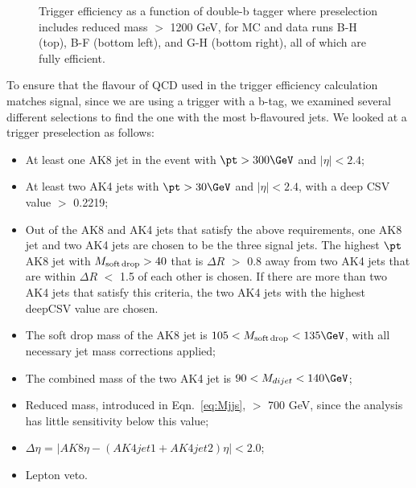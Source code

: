 \begin{figure}[thb!]
\begin{center}
\end{center}
\caption{Trigger efficiency as a function of double-b tagger where preselection includes reduced mass $>$ 1200 GeV, for MC and data runs B-H (top), B-F (bottom left), and G-H (bottom right), all of which are fully efficient.}
\label{fig:doubleb1200}
\end{figure}

To ensure that the flavour of QCD used in the trigger efficiency calculation matches signal, since we are using a trigger with a b-tag, we examined several different selections to find the one with the most b-flavoured jets. We looked at a trigger preselection as follows:

\begin{itemize}
 \item At least one AK8 jet in the event with $\pt > 300\GeV$ and $|\eta| < 2.4$;
 \item At least two AK4 jets with $\pt > 30\GeV$ and $|\eta| < 2.4$, with a deep CSV value $>$ 0.2219;
 \item Out of the AK8 and AK4 jets that satisfy the above requirements, one AK8 jet and two AK4 jets are chosen to be the three signal jets. The highest $\pt$ AK8 jet with $M_{\rm soft\,drop} > 40$ \GeV that is $\Delta R$ $>$ 0.8 away from two AK4 jets that are within $\Delta R$ $<$ 1.5 of each other is chosen. If there are more than two AK4 jets that satisfy this criteria, the two AK4 jets with the highest deepCSV value are chosen.
 \item The soft drop mass of the AK8 jet is $105 < M_{\rm soft\,drop} < 135\GeV$, with all necessary jet mass corrections applied;
 \item The combined mass of the two AK4 jet is $90 < M_{dijet} < 140\GeV$;
 \item Reduced mass, introduced in Eqn.~\ref{eq:Mjjs}, $>$ 700 GeV, since the analysis has little sensitivity below this value;
 \item $\Delta\eta$ = $|AK8\eta - (AK4jet1 + AK4jet2)\eta| < 2.0$;
 \item Lepton veto.
\end{itemize}

